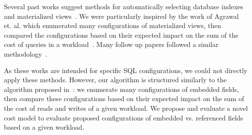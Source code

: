 Several past works suggest methods for automatically selecting database indexes and materialized views~\cite{Goldstein2001,Zilio2004,Gupta2005,Yang1997,Agrawal2000}. We were particularly inspired by the work of Agrawal et. al. which enumerated many configurations of materialized views, then compared the configurations based on their expected impact on the sum of the cost of queries in a workload~\cite{Agrawal2000}. Many follow up papers followed a similar methodology~\cite{Goldstein2001,Zilio2004,Gupta2005}.

As these works are intended for specific SQL configurations, we could not directly apply these methods. However, our algorithm is structured similarly to the algorithm proposed in~\cite{Agrawal2000}: we enumerate many configurations of embedded fields, then compare these configurations based on their expected impact on the sum of the cost of reads and writes of a given workload. 
We propose and evaluate a novel cost model to evaluate proposed configurations of embedded vs. referenced fields based on a given workload. 

%
